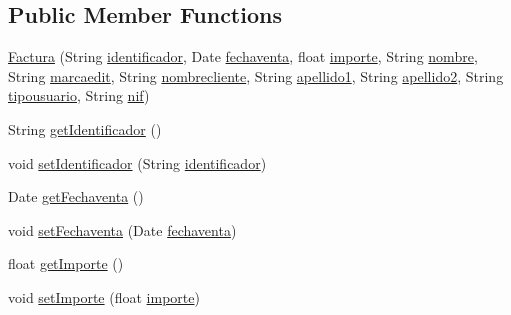 \subsection*{Public Member Functions}
\begin{DoxyCompactItemize}
\item 
\mbox{\hyperlink{classlibreria_1_1_factura_af01d3b5e4f0d41bd2a669363921e2619}{Factura}} (String \mbox{\hyperlink{classlibreria_1_1_factura_a7bb7a8e9b6d2211ea69eed1db513a47b}{identificador}}, Date \mbox{\hyperlink{classlibreria_1_1_factura_aac2c75df73a6156cca7c561448d1a783}{fechaventa}}, float \mbox{\hyperlink{classlibreria_1_1_factura_ad6da76d97fe2956e230c0757d14ae664}{importe}}, String \mbox{\hyperlink{classlibreria_1_1_factura_acd12a84d167767add71cac38d219088f}{nombre}}, String \mbox{\hyperlink{classlibreria_1_1_factura_a71087e2afc07fab380ed309a19577cec}{marcaedit}}, String \mbox{\hyperlink{classlibreria_1_1_factura_a6a9dc56e42e06f7928de4c51bff30443}{nombrecliente}}, String \mbox{\hyperlink{classlibreria_1_1_factura_a83e5ee3edddf7c91a71605ea4eeb9d5f}{apellido1}}, String \mbox{\hyperlink{classlibreria_1_1_factura_af91345af6a4d1ae15efc26bd3ef29524}{apellido2}}, String \mbox{\hyperlink{classlibreria_1_1_factura_a79b1b03330788462f7659fc11e6374fc}{tipousuario}}, String \mbox{\hyperlink{classlibreria_1_1_factura_a13e68de98d752d7226ca9107446075ec}{nif}})
\item 
String \mbox{\hyperlink{classlibreria_1_1_factura_a06c06b17c7ffa00e09f83bc17ca44b08}{get\+Identificador}} ()
\item 
void \mbox{\hyperlink{classlibreria_1_1_factura_a11e37f56998779507063eaaade930564}{set\+Identificador}} (String \mbox{\hyperlink{classlibreria_1_1_factura_a7bb7a8e9b6d2211ea69eed1db513a47b}{identificador}})
\item 
Date \mbox{\hyperlink{classlibreria_1_1_factura_a80b988d054efbab2424cbe791ba91afc}{get\+Fechaventa}} ()
\item 
void \mbox{\hyperlink{classlibreria_1_1_factura_a51a9e5bfa338742d674ba5a326213f13}{set\+Fechaventa}} (Date \mbox{\hyperlink{classlibreria_1_1_factura_aac2c75df73a6156cca7c561448d1a783}{fechaventa}})
\item 
float \mbox{\hyperlink{classlibreria_1_1_factura_a5ee2146a0d20c5fa5166c46be4fc07ce}{get\+Importe}} ()
\item 
void \mbox{\hyperlink{classlibreria_1_1_factura_ab90bbaf60897b82320034b2ba8df8d4f}{set\+Importe}} (float \mbox{\hyperlink{classlibreria_1_1_factura_ad6da76d97fe2956e230c0757d14ae664}{importe}})
\item 

\end{DoxyCompactItemize}
